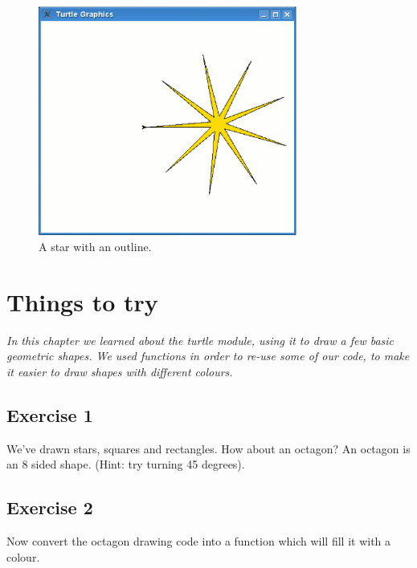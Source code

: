 \begin{figure}
\begin{center}
\includegraphics[width=85mm]{eps/figure30.eps}
\end{center}
\caption{A star with an outline.}\label{fig30}
\end{figure}

\section{Things to try}

\emph{In this chapter we learned about the turtle module, using it to draw a few basic geometric shapes. We used functions in order to re-use some of our code, to make it easier to draw shapes with different colours.}

\subsection*{Exercise 1}
We've drawn stars, squares and rectangles.  How about an octagon?  An octagon is an 8 sided shape.
(Hint: try turning 45 degrees).

\subsection*{Exercise 2}
Now convert the octagon drawing code into a function which will fill it with a colour.

\newpage
